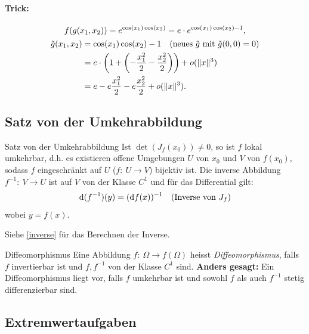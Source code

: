 \documentclass[a4paper,10pt]{article}
\begin{document}
\paragraph{Trick:}
\begin{gather*}
    f(g(x_1, x_2)) = e^{\cos(x_1) \cos(x_2)} = e \cdot e^{\cos(x_1) \cos(x_2) - 1} \text{,} \\
    \begin{aligned}
        \tilde{g}(x_1, x_2) &= \cos(x_1) \cos(x_2) - 1 \quad \text{(neues \( \tilde{g} \) mit \( \tilde{g}(0, 0) = 0 \))} \\
        &= e \cdot \left( 1 + \left(-\frac{x_1^2}{2} - \frac{x_2^2}{2} \right) \right) + o(\| x \|^3) \\
        &= e - e \frac{x_1^2}{2} - e \frac{x_2^2}{2} + o(\| x \|^3).
    \end{aligned}
\end{gather*}





\subsection{Satz von der Umkehrabbildung}

\begin{mainbox}{Satz von der Umkehrabbildung}
    Ist \( \det(J_f(x_0)) \neq 0 \), so ist \( f \) lokal umkehrbar, d.h. es existieren offene Umgebungen \( U \) von \( x_0 \) und \( V \) von \( f(x_0) \), sodass \( f \) eingeschränkt auf \( U \) (\( f: \: U \to V \)) bijektiv ist. Die inverse Abbildung \( f^{-1}: \: V \to U \) ist auf \( V \) von der Klasse \( C^1 \) und für das Differential gilt:
    \[
        \mathrm{d}(f^{-1})(y) = (\mathrm{d}f(x))^{-1} \quad \text{(Inverse von \( J_f \))}
    \]
    wobei \( y = f(x) \).
\end{mainbox}

Siehe \ref{inverse} für das Berechnen der Inverse.

\begin{mainbox}{Diffeomorphismus}
    Eine Abbildung \( f: \: \Omega \to f(\Omega) \) heisst \emph{Diffeomorphismus}, falls \( f \) invertierbar ist und \( f, f^{-1} \) von der Klasse \( C^1 \) sind. \textbf{Anders gesagt:} Ein Diffeomorphismus liegt vor, falls \( f \) umkehrbar ist und sowohl \( f \) als auch \( f^{-1} \) stetig differenzierbar sind.
\end{mainbox}


\subsection{Extremwertaufgaben}
\end{document}
